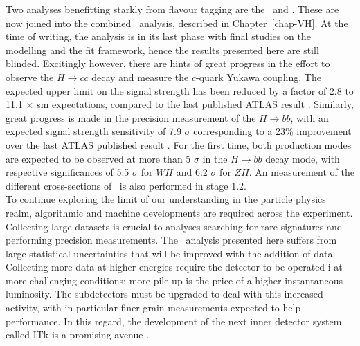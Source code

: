 Two analyses benefitting starkly from flavour tagging are the \vhb\ and \vhc. These are now joined into the combined \vhbc\ analysis, described in Chapter~\ref{chap-VH}. At the time of writing, the analysis is in its last phase with final studies on the modelling and the fit framework, hence the results presented here are still blinded. Excitingly however, there are hints of great progress in the effort to observe the $H \rightarrow c\bar{c}$ decay and measure the $c$-quark Yukawa coupling. The expected upper limit on the signal strength has been reduced by a factor of 2.8 to 11.1 $\times$ \gls{sm} expectations, compared to the last published ATLAS result \cite{Collaboration:2721696}. Similarly, great progress is made in the precision measurement of the $H \rightarrow b\bar{b}$, with an expected signal strength sensitivity of 7.9 $\sigma$ corresponding to a 23\% improvement over the last ATLAS published result \cite{ATLAS:2021wqh}. For the first time, both production modes are expected to be observed at more than 5 $\sigma$ in the $H \rightarrow b\bar{b}$ decay mode, with respective significances of 5.5 $\sigma$ for $WH$ and 6.2 $\sigma$ for $ZH$. An  measurement of the different cross-sections of \vhb\ is also performed in stage 1.2.\\

To continue exploring the limit of our understanding in the particle physics realm, algorithmic and machine developments are required across the experiment. Collecting large datasets is crucial to analyses searching for rare signatures and performing precision measurements. The \vhbc\ analysis presented here suffers from large statistical uncertainties that will be improved with the addition of data. Collecting more data at higher energies require the detector to be operated i at more challenging conditions: more pile-up is the price of a higher instantaneous luminosity. The subdetectors must be upgraded to deal with this increased activity, with in particular finer-grain measurements expected to help performance. In this regard, the development of the next inner detector system called ITk is a promising avenue \cite{Bortoletto:2022wcx}. \\

